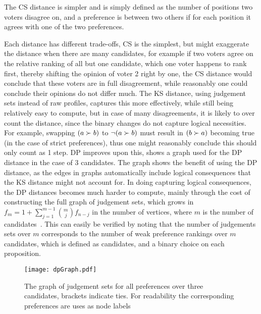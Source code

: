 The CS distance is simpler and is simply defined as the number of positions two
voters disagree on, and a preference is between two others if for each position
it agrees with one of the two preferences.

Each distance has different trade-offs, CS is the simplest, but might
exaggerate the distance when there are many candidates, for example if two voters
agree on the relative ranking of all but one candidate, which one voter happens
to rank first, thereby shifting the opinion of voter 2 right by one, the CS
distance would conclude that these voters are in full disagreement, while
reasonably one could conclude their opinions do not differ much. The KS
distance, using judgement sets instead of raw profiles, captures this more
effectively, while still being relatively easy to compute, but in case of many
disagreements, it is likely to over count the distance, since the binary
changes do not capture logical necessities. For example, swapping $( a \succ
	b)$ to $\neg (a \succ b)$ must result in $(b \succ a)$ becoming true (in the
case of strict preferences), thus one might reasonably conclude this should
only count as 1 step. DP improves upon this,  shows a
graph used for the DP distance in the case of 3 candidates. The graph shows the
benefit of using the DP distance, as the edges in graphs automatically include
logical consequences that the KS distance might not account for. In doing
capturing logical consequences, the DP distances becomes much harder to
compute, mainly through the cost of constructing the full graph of judgement
sets, which grows in $f_m = 1 + \sum_{j=1}^{m-1} \binom{m}{j} f_{n-j}$ in the
number of vertices, where $m$ is the number of
candidates~\cite{grossPreferentialArrangements1962}. This can easily be
verified by noting that the number of judgements sets over $m$ corresponds to
the number of weak preference rankings over $m$ candidates, which is defined as
candidates, and a binary choice on each proposition.



\vspace{1em}
\begin{figure}[ht]
	\centering
	\texttt{[image: dpGraph.pdf]}
	\caption{The graph of judgement sets for all preferences over three
		candidates, brackets indicate ties. For readability the corresponding
		preferences are uses as node labels}
	\label{figure:DPDistance}
\end{figure}



